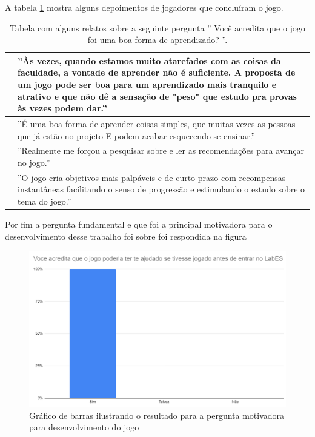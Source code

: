 A tabela \ref{tbl-relatos-jogo} mostra alguns depoimentos de jogadores que concluíram o jogo.
\begin{table}[h!]
	\caption{Tabela com alguns relatos sobre a seguinte pergunta '' Você acredita que o jogo foi uma boa forma de aprendizado? ''.}
	\label{tbl-relatos-jogo}
	\centering
	\renewcommand{\arraystretch}{2}
	\begin{small}
		\begin{tabular}{ | p{35mm} | p{100mm} |}\hline
			\centering{Pessoa 1} & ''Às vezes, quando estamos muito atarefados com as coisas da faculdade, a vontade de aprender não é suficiente. A proposta de um jogo pode ser boa para um aprendizado mais tranquilo e atrativo e que não dê a sensação de "peso" que estudo pra provas às vezes podem dar.'' \\\hline
			\centering{Pessoa 2} & ''É uma boa forma de aprender coisas simples, que muitas vezes as pessoas que já estão no projeto E podem acabar esquecendo se ensinar.'' \\\hline
			\centering{Pessoa 3} & ''Realmente me forçou a pesquisar sobre e ler as recomendações para avançar no jogo.'' \\\hline
                \centering{Pessoa 4} & ''O jogo cria objetivos mais palpáveis e de curto prazo com recompensas instantâneas facilitando o senso de progressão e estimulando o estudo sobre o tema do jogo.'' \\\hline
		\end{tabular}
	\end{small}
\end{table}

Por fim a pergunta fundamental e que foi a principal motivadora para o desenvolvimento desse trabalho foi sobre foi respondida na figura 

\begin{figure}[h!]
    \centering
    \includegraphics[width=0.81\linewidth]{figuras/graph-1.png}
    \caption{Gráfico de barras ilustrando o resultado para a pergunta motivadora para desenvolvimento do jogo}
    \label{fig:graph-1}
\end{figure}